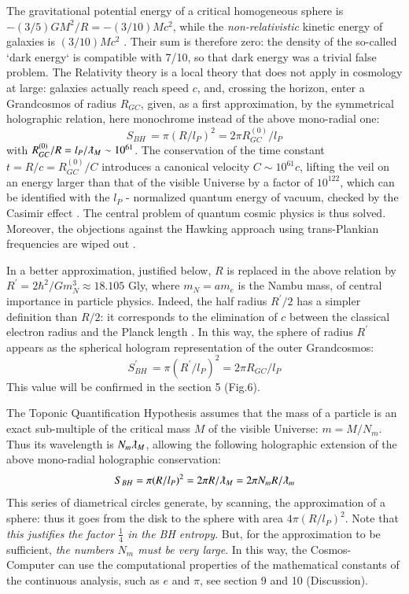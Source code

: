 \documentclass[twoside,draft]{article}
\begin{document}
\begin{sloppypar}
The gravitational potential energy of a critical homogeneous sphere is $-(3/5)GM^{2}/R = -
(3/10)Mc^{2}$, while the \textit{non-relativistic} kinetic energy of galaxies is $(3/10)Mc^{2}$ \cite{Sanchez1}. Their sum is therefore zero: the density of the so-called `dark energy` is compatible with 7/10, so that dark energy was a trivial false problem. 
The Relativity theory is a local theory that does not apply in cosmology at large: 
galaxies actually reach speed $c$, and, crossing the horizon, enter a Grandcosmos of radius $R_{GC}$, given, as a first approximation, by the symmetrical holographic relation, here monochrome instead of the above mono-radial one:
\begin{equation}
S_{BH}\, = \pi(R/l_P )^{2} = 2\pi R^{(0)}_{GC} /l_{P}
\end{equation}
with $R^{(0)}_{GC} /R = l_{P} /\lambdabar_{M} \sim 10^{61}$. 
The conservation of the time constant $t = R/c = R^{(0)}_{GC} /C$ introduces a canonical velocity $C \sim 10^{61} c$, 
lifting the veil on an energy larger than that of the visible Universe by a factor of $10^{122}$, which can be identified with the $l_{P}$ - normalized quantum energy of vacuum, checked by the Casimir effect \cite{Duplantier}. The central problem of quantum cosmic physics is thus solved. Moreover, the objections against the Hawking approach using trans-Plankian frequencies are wiped out \cite{Damour}.

In a better approximation, justified below, $R$ is replaced in the above relation by $R^{\prime} = 2\hbar^{2}/Gm_{N}^{3}
\approx 18.105$ Gly, where $m_{N} = am_{e}$ is the Nambu mass, of central importance in particle physics. Indeed, the half radius $R^{\prime}/2$ has a simpler definition than $R/2$: it corresponds to the elimination of $c$ between the classical electron radius and the Planck length \cite{Sanchez1}. In this way, the sphere of radius $R^{\prime}$ appears 
as the spherical hologram representation of the outer Grandcosmos:
\begin{equation}
S^{\prime}_{BH}\, = \pi(R^{\prime}/l_{P})^{2} = 2\pi R_{GC} /l_{P}
\end{equation}
This value will be confirmed in the section 5 (Fig.6).

The Toponic Quantification Hypothesis assumes that the mass of a particle is an exact sub-multiple 
of the critical  mass $M$ of the visible Universe: $m = M/N_{m}$. Thus its wavelength is 
$N_m \lambdabar_{M}$, allowing the following holographic extension of the above mono-radial holographic conservation:
\begin{equation}
S_{BH} = \pi(R/l_{P})^{2} = 2\pi R/\lambdabar_{M} = 2\pi N_{m} R/\lambdabar_{m}
\end{equation}
This series of diametrical circles generate, by scanning, the approximation of a sphere: thus it goes 
from the disk to the sphere with area $4\pi(R/l_{P})^{2}$. Note that \textit{this justifies the factor $\frac{1}{4}$ in the BH entropy}. 
But, for the approximation to be sufficient, \textit{the numbers $N_{m}$ must be very large}. In this way, the Cosmos-
Computer can use the computational properties of the mathematical constants of the continuous analysis, such as $e$ and $\pi$, see section 9 and 10 (Discussion).


\end{sloppypar}
\end{document}
